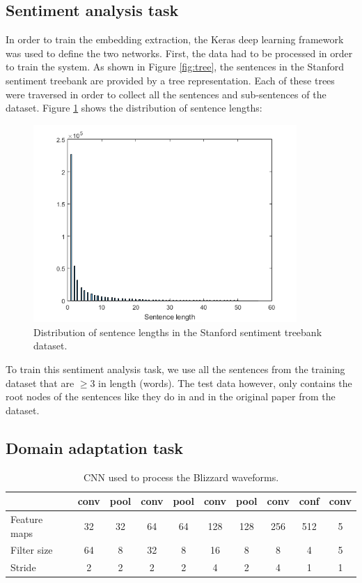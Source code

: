 \subsection*{Sentiment analysis task}

In order to train the embedding extraction, the Keras deep learning framework was used to define the two networks. First, the data had to be processed in order to train the system. As shown in Figure \ref{fig:tree}, the sentences in the Stanford sentiment treebank are provided by a tree representation. Each of these trees were traversed in order to collect all the sentences and sub-sentences of the dataset. Figure \ref{fig:sent-histo} shows the distribution of sentence lengths:

\begin{figure}[h]
    \centering
    \includegraphics[width=10cm]{figures/sa-histo}
    \caption{Distribution of sentence lengths in the Stanford sentiment treebank dataset.}
    \label{fig:sent-histo}
\end{figure}

To train this sentiment analysis task, we use all the sentences from the training dataset that are $\ge 3$ in length (words). The test data however, only contains the root nodes of the sentences like they do in \cite{DBLP:journals/corr/Kim14f} and in the original paper from the dataset.

\subsection*{Domain adaptation task}

\begin{table}[h]
    \centering
    \begin{tabular}{l|c|c|c|c|c|c|c|c|c}
                     & conv & pool & conv & pool & conv & pool & conv & conf & conv \\
        \hline
        Feature maps & 32    & 32   & 64   & 64   & 128  & 128  & 256 & 512  & 5 \\
        Filter size  & 64    & 8    & 32   & 8    & 16   & 8    & 8   & 4    & 5 \\
        Stride       & 2     & 2    & 2    & 2    & 4    & 2    & 4   & 1    & 1 \\
    \end{tabular}
    \caption{CNN used to process the Blizzard waveforms.}
    \label{tab:sent-cnn}
\end{table}

